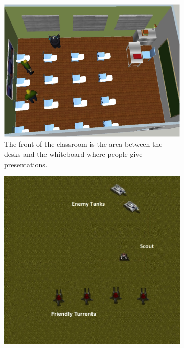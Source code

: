 \documentclass[11pt,letterpaper]{article}
\begin{document}
\begin{figure}
\centering
  \begin{subfigure}[b]{0.3\textwidth}
  \includegraphics[width=\textwidth]{figures/classroom.png}
  \caption{The front of the classroom is the area between the desks and the whiteboard where people give presentations.}
  \end{subfigure}
\begin{subfigure}[b]{0.3\textwidth}
  \includegraphics[width=\textwidth]{figures/safety-3.jpg}

\end{subfigure}
\end{figure}
\end{document}
